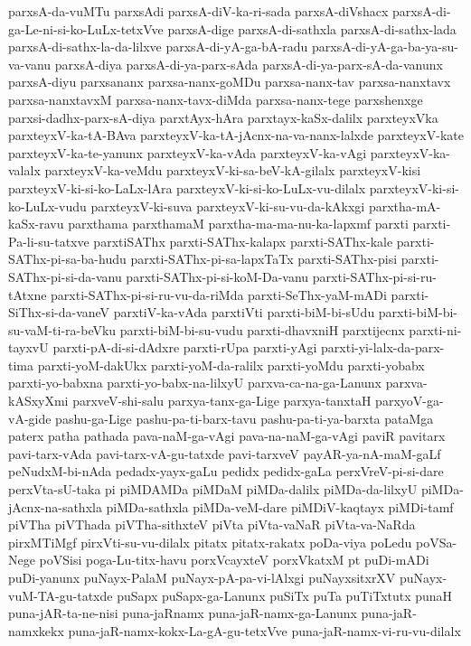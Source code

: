 {parxsA-da-vuMTu
parxsAdi
parxsA-diV-ka-ri-sada
parxsA-diVshacx
parxsA-di-ga-Le-ni-si-ko-LuLx-tetxVve
parxsA-dige
parxsA-di-sathxla
parxsA-di-sathx-lada
parxsA-di-sathx-la-da-lilxve
parxsA-di-yA-ga-bA-radu
parxsA-di-yA-ga-ba-ya-su-va-vanu
parxsA-diya
parxsA-di-ya-parx-sAda
parxsA-di-ya-parx-sA-da-vanunx
parxsA-diyu
parxsananx
parxsa-nanx-goMDu
parxsa-nanx-tav
parxsa-nanxtavx
parxsa-nanxtavxM
parxsa-nanx-tavx-diMda
parxsa-nanx-tege
parxshenxge
parxsi-dadhx-parx-sA-diya
parxtAyx-hAra
parxtayx-kaSx-dalilx
parxteyxVka
parxteyxV-ka-tA-BAva
parxteyxV-ka-tA-jAcnx-na-va-nanx-lalxde
parxteyxV-kate
parxteyxV-ka-te-yanunx
parxteyxV-ka-vAda
parxteyxV-ka-vAgi
parxteyxV-ka-valalx
parxteyxV-ka-veMdu
parxteyxV-ki-sa-beV-kA-gilalx
parxteyxV-kisi
parxteyxV-ki-si-ko-LaLx-lAra
parxteyxV-ki-si-ko-LuLx-vu-dilalx
parxteyxV-ki-si-ko-LuLx-vudu
parxteyxV-ki-suva
parxteyxV-ki-su-vu-da-kAkxgi
parxtha-mA-kaSx-ravu
parxthama
parxthamaM
parxtha-ma-ma-nu-ka-lapxmf
parxti
parxti-Pa-li-su-tatxve
parxtiSAThx
parxti-SAThx-kalapx
parxti-SAThx-kale
parxti-SAThx-pi-sa-ba-hudu
parxti-SAThx-pi-sa-lapxTaTx
parxti-SAThx-pisi
parxti-SAThx-pi-si-da-vanu
parxti-SAThx-pi-si-koM-Da-vanu
parxti-SAThx-pi-si-ru-tAtxne
parxti-SAThx-pi-si-ru-vu-da-riMda
parxti-SeThx-yaM-mADi
parxti-SiThx-si-da-vaneV
parxtiV-ka-vAda
parxtiVti
parxti-biM-bi-sUdu
parxti-biM-bi-su-vaM-ti-ra-beVku
parxti-biM-bi-su-vudu
parxti-dhavxniH
parxtijecnx
parxti-ni-tayxvU
parxti-pA-di-si-dAdxre
parxti-rUpa
parxti-yAgi
parxti-yi-lalx-da-parx-tima
parxti-yoM-dakUkx
parxti-yoM-da-ralilx
parxti-yoMdu
parxti-yobabx
parxti-yo-babxna
parxti-yo-babx-na-lilxyU
parxva-ca-na-ga-Lanunx
parxva-kASxyXmi
parxveV-shi-salu
parxya-tanx-ga-Lige
parxya-tanxtaH
parxyoV-ga-vA-gide
pashu-ga-Lige
pashu-pa-ti-barx-tavu
pashu-pa-ti-ya-barxta
pataMga
paterx
patha
pathada
pava-naM-ga-vAgi
pava-na-naM-ga-vAgi
paviR
pavitarx
pavi-tarx-vAda
pavi-tarx-vA-gu-tatxde
pavi-tarxveV
payAR-ya-nA-maM-gaLf
peNudxM-bi-nAda
pedadx-yayx-gaLu
pedidx
pedidx-gaLa
perxVreV-pi-si-dare
perxVta-sU-taka
pi
piMDAMDa
piMDaM
piMDa-dalilx
piMDa-da-lilxyU
piMDa-jAcnx-na-sathxla
piMDa-sathxla
piMDa-veM-dare
piMDiV-kaqtayx
piMDi-tamf
piVTha
piVThada
piVTha-sithxteV
piVta
piVta-vaNaR
piVta-va-NaRda
pirxMTiMgf
pirxVti-su-vu-dilalx
pitatx
pitatx-rakatx
poDa-viya
poLedu
poVSa-Nege
poVSisi
poga-Lu-titx-havu
porxVcayxteV
porxVkatxM
pt
puDi-mADi
puDi-yanunx
puNayx-PalaM
puNayx-pA-pa-vi-lAlxgi
puNayxsitxrXV
puNayx-vuM-TA-gu-tatxde
puSapx
puSapx-ga-Lanunx
puSiTx
puTa
puTiTxtutx
punaH
puna-jAR-ta-ne-nisi
puna-jaRnamx
puna-jaR-namx-ga-Lanunx
puna-jaR-namxkekx
puna-jaR-namx-kokx-La-gA-gu-tetxVve
puna-jaR-namx-vi-ru-vu-dilalx
}
